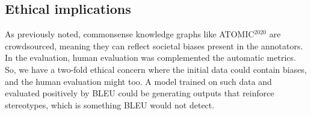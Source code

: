 
\subsection{Ethical implications}

As previously noted, commonsense knowledge graphs like ATOMIC$^{2020}$ are crowdsourced, meaning they can reflect societal biases present in the annotators. In the evaluation, human evaluation was complemented the automatic metrics. So, we have a two-fold ethical concern where the initial data could contain biases, and the human evaluation might too. A model trained on such data and evaluated positively by BLEU could be generating outputs that reinforce stereotypes, which is something BLEU would not detect.